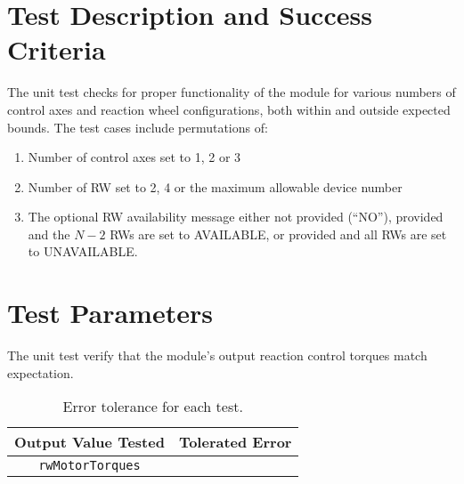 
\section{Test Description and Success Criteria}
The unit test checks for proper functionality of the module for various numbers of control axes and reaction wheel configurations, both within and outside expected bounds. The  test cases  include permutations of:
\begin{enumerate}
\item Number of control axes set to 1, 2 or 3
\item Number of RW set to 2, 4 or the maximum allowable device number
\item The optional RW availability message either not provided (``NO''), provided and the $N-2$ RWs are set to AVAILABLE, or provided and all RWs are set to UNAVAILABLE.

\end{enumerate}


\section{Test Parameters}

The unit test verify that the module's output reaction control torques match expectation.
\begin{table}[htbp]
	\caption{Error tolerance for each test.}
	\label{tab:errortol}
	\centering \fontsize{10}{10}\selectfont
	\begin{tabular}{ c | c } %
		\hline\hline
		\textbf{Output Value Tested}  & \textbf{Tolerated Error}  \\ 
		\hline
		{\tt rwMotorTorques}        & 	   \\ 
		\hline\hline
	\end{tabular}
\end{table}




